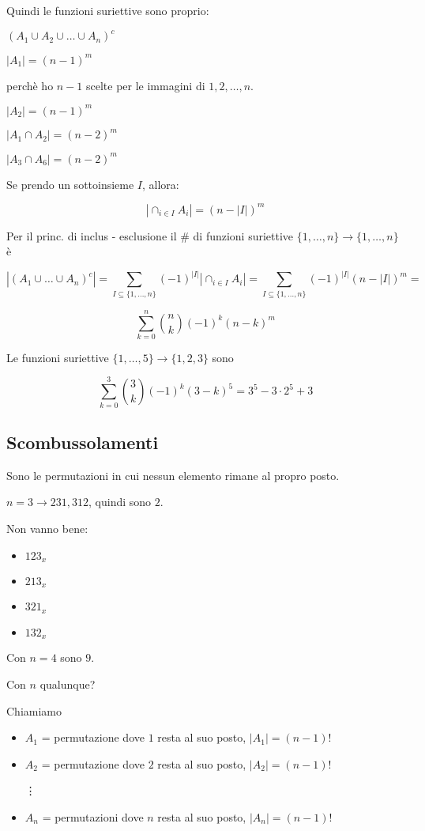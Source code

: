 \documentclass[11pt]{article}
\begin{document}
		Quindi le funzioni suriettive sono proprio:

		$(A_1 \cup A_2 \cup \ldots \cup A_n)^{c}$
		
		$|A_1| = (n-1)^{m}$

		perch\`e ho $n-1$ scelte per le immagini di $1,2,\ldots,n$.

		$|A_2|=(n-1)^{m}$

		$|A_1 \cap A_2| = (n-2)^{m}$

		$|A_3 \cap A_6| = (n-2)^{m}$

		Se prendo un sottoinsieme $I$, allora:

		\[
			|\cap_{i \in I} A_i| = (n-|I|)^{m}
		\]

		Per il princ. di inclus - esclusione il \# di funzioni
		suriettive $\{1,\ldots,n\} \to  \{1,\ldots,n\}$ \`e 

		\[
			|(A_1 \cup \ldots \cup A_n)^{c}| = 
			\sum_{I \subseteq \{1,\ldots,n\}} (-1)^{|I|} 
			|\cap_{i \in I}A_i|
			=
			\sum_{I \subseteq \{1,\ldots,n\}}(-1)^{|I|} (n-|I|)^{m} =
		\]

		\[
			\sum_{k=0}^{n}\binom{n}{k}(-1)^{k}(n-k)^{m}
		\]

		Le funzioni suriettive $\{1,\ldots,5\} \to  \{1,2,3\}$ sono

		\[
			\sum_{k=0}^{3}\binom{3}{k}(-1)^{k}(3-k)^{5} = 3^5 - 3 \cdot 2^5 + 3
		\]

		\subsection{Scombussolamenti}

		Sono le permutazioni in cui nessun elemento rimane al propro posto.

		$n=3 \longrightarrow 231,  312$, quindi sono $2$.
		
		Non vanno bene:

		\begin{itemize}
			\item $123_{x}$
			\item $213_{x}$
			\item $321_{x}$
			\item $132_{x}$
		\end{itemize}

		Con $n=4$ sono $9$.

		Con $n$ qualunque?

		Chiamiamo 

		\begin{itemize}
			\item $A_1$ = {permutazione dove $1$ resta al suo posto},
				$|A_1| = (n-1)!$
			\item $A_2$ = {permutazione dove $2$ resta al suo posto},
				$|A_2| = (n-1)!$
			
			\vdots
			\item $A_n$ = {permutazioni dove $n$ resta al suo posto},
				$|A_n| = (n-1)!$
		\end{itemize}
\end{document}
